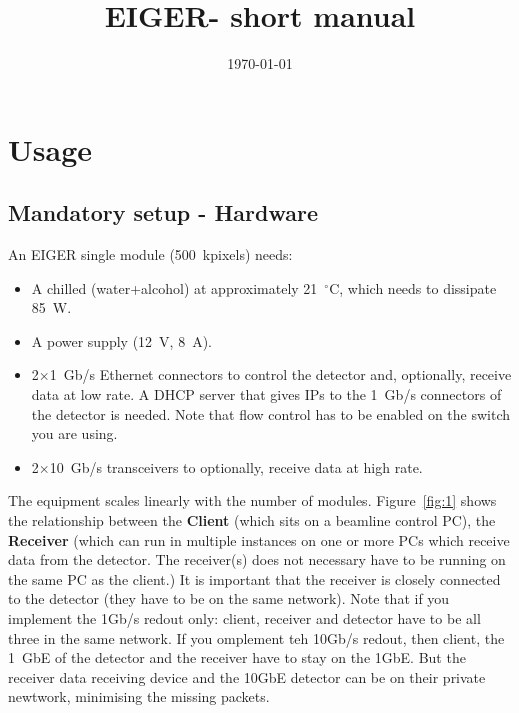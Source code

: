 \documentclass{article}
\newcommand{\E}{EIGER\xspace}
\begin{document}
\title{\E - short manual}
\date{\today}
\maketitle
\tableofcontents

\section{Usage}

\subsection{Mandatory setup - Hardware}
An EIGER single module (500~kpixels) needs:
\begin{itemize}
\item A chilled (water+alcohol) at approximately 21~$^{\circ}$C, which needs to dissipate 85~W.
\item A power supply (12~V, 8~A).
\item 2$\times$1~Gb/s Ethernet connectors to control the detector and, optionally, receive data at low rate. A DHCP server that gives IPs to the 1~Gb/s connectors of the detector is needed. Note that flow control has to be enabled on the switch you are using.
\item 2$\times$10~Gb/s transceivers to optionally, receive data at high rate.
\end{itemize}
The equipment scales linearly with the number of modules.
Figure~\ref{fig:1} shows the relationship between the \textbf{Client} (which sits on a beamline control PC), the \textbf{Receiver} (which can run in multiple instances on one or more PCs which receive data from the detector. The receiver(s) does not necessary have to be running on the same PC as the client.) It is important that the receiver is closely connected to the detector (they have to be on the same network). Note that if you implement the 1Gb/s redout only: client, receiver and detector have to be all three in the same network. If you omplement teh 10Gb/s redout, then client, the 1~GbE of the detector and the receiver have to stay on the 1GbE. But the receiver data receiving device and the 10GbE detector can be on their private newtwork, minimising the missing packets.  
\end{document}
